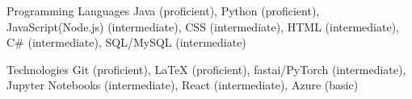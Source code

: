


\begin{cvskills}


\cvskill
{Programming Languages} %
{Java (proficient), Python (proficient), JavaScript(Node.js) (intermediate), CSS (intermediate), HTML (intermediate), C\# (intermediate), SQL/MySQL (intermediate)} %


\cvskill
{Technologies} %
{Git (proficient),  \textrm{\LaTeX} (proficient),
fastai/PyTorch (intermediate), Jupyter Notebooks (intermediate), React (intermediate), Azure (basic)} %





\end{cvskills}